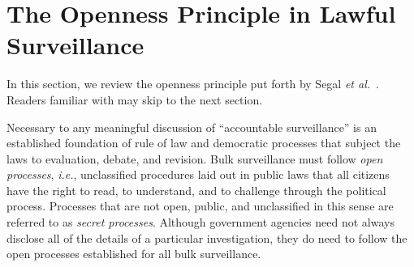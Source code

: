 \section{The Openness Principle in Lawful Surveillance}\label{sec-open}
In this section, we review the openness principle put forth by Segal 
{\it et al.}~\cite{sff-foci2014}.  Readers familiar with \cite{sff-foci2014} 
may skip to the next section.

Necessary to any meaningful discussion of ``accountable surveillance'' is an
established foundation of rule of law and democratic processes that subject
the laws to evaluation, debate, and revision.  Bulk surveillance must follow
{\it open processes}, {\it i.e.}, unclassified procedures laid out in public 
laws that all citizens have the right to read, to understand, and to challenge
through the political process.  Processes that are not open, public, and
unclassified in this sense are referred to as {\it secret processes}.  
Although government agencies need not always disclose all of the details of a 
particular investigation, they do need to follow the open processes 
established for all bulk surveillance.


